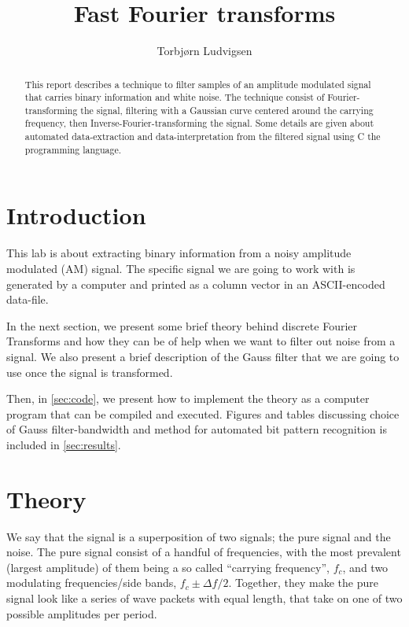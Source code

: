 \documentclass[12pt,a4paper]{article}
\author{Torbjørn Ludvigsen}
\title{Fast Fourier transforms}
\begin{document}
\maketitle
%

\begin{abstract}
  This report describes a technique to filter samples of an amplitude modulated signal
  that carries binary information and white noise. The technique consist
  of Fourier-transforming the signal, filtering with a Gaussian curve centered
  around the carrying frequency, then Inverse-Fourier-transforming the signal.
  Some details are given about automated data-extraction and data-interpretation
  from the filtered signal using C the programming language.
\end{abstract}

\vspace{2cm}
\tableofcontents
\clearpage

\section{Introduction}
This lab is about extracting binary information from a noisy amplitude modulated (AM) signal.
The specific signal we are going to work with is generated by a computer and printed as a column vector
in an ASCII-encoded data-file. 

In the next section, we present some brief theory behind discrete Fourier Transforms
and how they can be of help when we want to filter out noise from a signal.
We also present a brief description of the Gauss filter that we are going to use
once the signal is transformed.

Then, in \ref{sec:code}, we present how to implement the theory as
a computer program that can be compiled and executed.
Figures and tables discussing choice of Gauss filter-bandwidth and method for automated
bit pattern recognition is included in \ref{sec:results}.

\section{Theory}
We say that the signal is a superposition of two signals; the pure signal and the noise.
The pure signal consist of a handful of frequencies, with
the most prevalent (largest amplitude) of them being a so called ``carrying frequency'',
$f_c$, and two modulating frequencies/side bands, $f_c\pm\Delta f/2$.
Together, they make the pure signal look like
a series of wave packets with equal length, that take on one of two
possible amplitudes per period.
\end{document}
